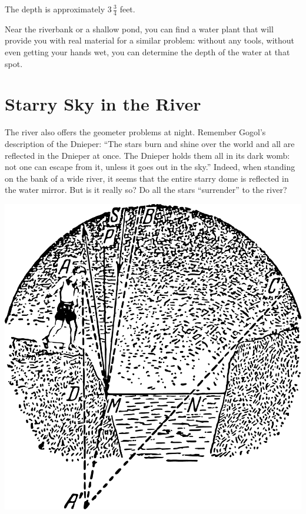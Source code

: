 The depth is approximately $3\,\frac{3}{4}$ feet.

Near the riverbank or a shallow pond, you can find a water plant that will provide you with real material for a similar problem: without any tools, without even getting your hands wet, you can determine the depth of the water at that spot.



\section{Starry Sky in the River}
\label{sec-2.16}

The river also offers the geometer problems at night. Remember Gogol's description of the Dnieper: ``The stars burn and shine over the world and all are reflected in the Dnieper at once. The Dnieper holds them all in its dark womb: not one can escape from it, unless it goes out in the sky.'' Indeed, when standing on the bank of a wide river, it seems that the entire starry dome is reflected in the water mirror. But is it really so? Do all the stars ``surrender'' to the river?
\begin{marginfigure}[-1cm]%
\centering
\includegraphics[width=1.\textwidth]{figures/ch-02/fig-054.pdf}
\end{marginfigure}

